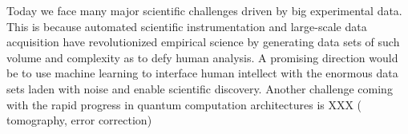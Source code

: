 \documentclass[aps,prb,floatfix,amsmath,amssymb,amsfonts,10pt,floatfix,longbibliography]{revtex4-1}
\begin{document}
\begin{enumerate}
Today we face many major scientific challenges driven by big experimental data. This is because automated scientific instrumentation and large-scale data acquisition have revolutionized empirical science by generating data sets of such volume and complexity as to defy human analysis. A promising direction would be to use machine learning to interface human intellect with the 
enormous data sets laden with noise and enable scientific discovery. 
Another challenge coming with the rapid progress in quantum computation architectures is XXX ( tomography, error correction) 







\end{enumerate}
\end{document}
